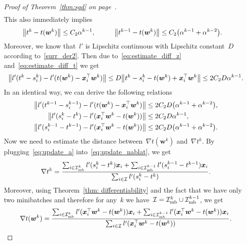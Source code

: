 \begin{proof}[Proof of Theorem~\ref{thm:sgd} on page~\pageref{thm:sgd}]
\begin{equation}
\begin{aligned}
    \end{aligned}
  \end{equation}
  This also immediately implies
  \begin{equation}\label{eq:estimate_diff_t}
    \begin{aligned}
      \norm{t^k - t(\bm{w}^k)}     & \leq C_2\alpha^{k-1}, \quad & \quad
      \norm{t^{k-1} - t(\bm{w}^k)} & \leq C_2\Brac{\alpha^{k-1}+\alpha^{k-2}}.
    \end{aligned}
  \end{equation}
  Moreover, we know that~$l'$ is Lipschitz continuous with Lipschitz constant~$D$ according to~\ref{surr_der2}. Then due to~\eqref{eq:estimate_diff_z} and~\eqref{eq:estimate_diff_t} we get
  \begin{equation}\label{eq:sgd_lipschitz1}
    \norm{l'(t^k-s_i^k) - l'(t(\bm{w}^k)-\bm{x}_i^\top \bm{w}^k)}
      \leq D \norm{t^k-s_i^k - t(\bm{w}^k)+ \bm{x}_i^\top \bm{w}^k}
      \leq  2C_2 D \alpha^{k-1}.
  \end{equation}
  In an identical way, we can derive the following relations
  \begin{equation}\label{eq:sgd_lipschitz2}
    \begin{aligned}
      \norm{l'(t^{k-1}-s_i^{k-1}) - l'(t(\bm{w}^k)-\bm{x}_i^\top \bm{w}^k)}
        & \leq 2C_2D\Brac{\alpha^{k-1}+\alpha^{k-2}}, \\
      \norm{l'(s_i^k-t^k) - l'(\bm{x}_i^\top \bm{w}^k-t(\bm{w}^k))}
        & \leq 2C_2D\alpha^{k-1}, \\
      \norm{l'(s_i^{k-1}-t^{k-1}) - l'(\bm{x}_i^\top \bm{w}^k-t(\bm{w}^k))}
        & \leq 2C_2D\Brac{\alpha^{k-1}+\alpha^{k-2}}.
    \end{aligned}
  \end{equation}
  Now we need to estimate the distance between~$\nabla t(\bm{w}^k)$ and~$\nabla t^k$. By plugging~\eqref{eq:update_a} into~\eqref{eq:update_nablat}, we get
  \begin{equation*}
    \nabla t^k
      = \frac{\sum_{i \in \mathcal{I}_{\text{mb}}^k} l'(s_i^k - t^k)\bm{x}_i + \sum_{i \in \mathcal{I}_{\text{mb}}^{k-1}} l'(s_i^{k-1} - t^{k-1}) \bm{x}_i}{\sum_{i \in \mathcal{I}} l'(s_i^k - t^k)}.
  \end{equation*}
  Moreover, using Theorem~\ref{thm: differentiability} and the fact that we have only two minibatches and therefore for any~$k$ we have~$\mathcal{I} = \mathcal{I}_{\text{mb}}^k \cup \mathcal{I}_{\text{mb}}^{k-1}$, we get
  \begin{equation*}
    \nabla t(\bm{w}^k)
      = \frac{\sum_{i \in \Imb^k} l'(\bm{x}_i^\top \bm{w}^k - t(\bm{w}^k))\bm{x}_i + \sum_{i \in \Imb^{k-1}} l'(\bm{x}_i^\top \bm{w}^k - t(\bm{w}^k))\bm{x}_i}{\sum_{i \in \I} l'(\bm{x}_i^\top \bm{w}^k - t(\bm{w}^k))}.

\end{equation*}
\end{proof}
